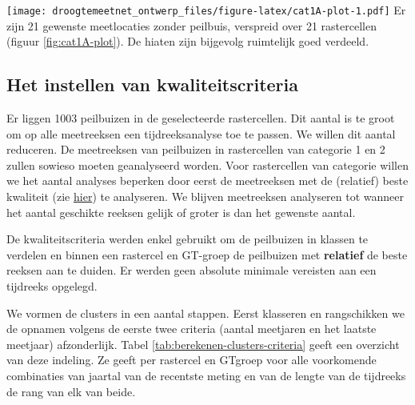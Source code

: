 \documentclass[11pt,]{book}
\begin{document}
\texttt{[image: droogtemeetnet\_ontwerp\_files/figure-latex/cat1A-plot-1.pdf]}
Er zijn 21 gewenste meetlocaties zonder peilbuis, verspreid over 21
rastercellen (figuur \ref{fig:cat1A-plot}). De hiaten zijn bijgevolg
ruimtelijk goed verdeeld.

\subsection{Het instellen van
kwaliteitscriteria}\label{het-instellen-van-kwaliteitscriteria}

Er liggen 1003 peilbuizen in de geselecteerde rastercellen. Dit aantal
is te groot om op alle meetreeksen een tijdreeksanalyse toe te passen.
We willen dit aantal reduceren. De meetreeksen van peilbuizen in
rastercellen van categorie 1 en 2 zullen sowieso moeten geanalyseerd
worden. Voor rastercellen van categorie willen we het aantal analyses
beperken door eerst de meetreeksen met de (relatief) beste kwaliteit
(zie \href{basiskwaliteitscriteria}{hier}) te analyseren. We blijven
meetreeksen analyseren tot wanneer het aantal geschikte reeksen gelijk
of groter is dan het gewenste aantal.

De kwaliteitscriteria werden enkel gebruikt om de peilbuizen in klassen
te verdelen en binnen een rastercel en GT-groep de peilbuizen met
\textbf{relatief} de beste reeksen aan te duiden. Er werden geen
absolute minimale vereisten aan een tijdreeks opgelegd.

We vormen de clusters in een aantal stappen. Eerst klasseren en
rangschikken we de opnamen volgens de eerste twee criteria (aantal
meetjaren en het laatste meetjaar) afzonderlijk. Tabel
\ref{tab:berekenen-clusters-criteria} geeft een overzicht van deze
indeling. Ze geeft per rastercel en GTgroep voor alle voorkomende
combinaties van jaartal van de recentste meting en van de lengte van de
tijdreeks de rang van elk van beide.
\end{document}
